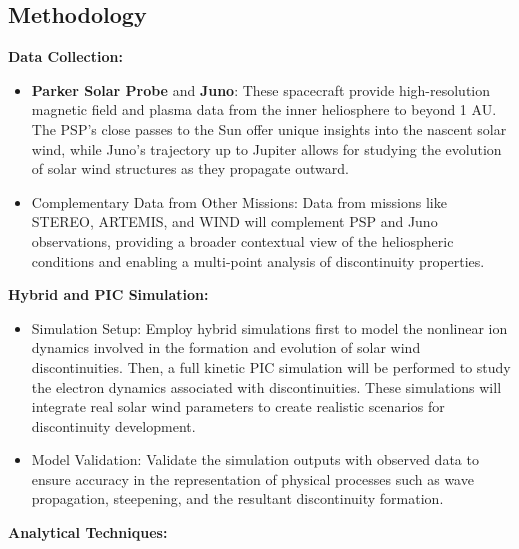 \documentclass[
  letterpaper,
  DIV=11,
  numbers=noendperiod]{scrartcl}
\begin{document}
\subsection{Methodology}\label{methodology}

\textbf{Data Collection:}

\begin{itemize}
\item
  \textbf{Parker Solar Probe} and \textbf{Juno}: These spacecraft provide high-resolution magnetic field and plasma data from the inner heliosphere to beyond 1 AU. The PSP's close passes to the Sun offer unique insights into the nascent solar wind, while Juno's trajectory up to Jupiter allows for studying the evolution of solar wind structures as they propagate outward.
\item
  Complementary Data from Other Missions: Data from missions like STEREO, ARTEMIS, and WIND will complement PSP and Juno observations, providing a broader contextual view of the heliospheric conditions and enabling a multi-point analysis of discontinuity properties.
\end{itemize}

\textbf{Hybrid and PIC Simulation:}

\begin{itemize}
\item
  Simulation Setup: Employ hybrid simulations first to model the nonlinear ion dynamics involved in the formation and evolution of solar wind discontinuities. Then, a full kinetic PIC simulation will be performed to study the electron dynamics associated with discontinuities. These simulations will integrate real solar wind parameters to create realistic scenarios for discontinuity development.
\item
  Model Validation: Validate the simulation outputs with observed data to ensure accuracy in the representation of physical processes such as wave propagation, steepening, and the resultant discontinuity formation.
\end{itemize}

\textbf{Analytical Techniques:}
\end{document}
